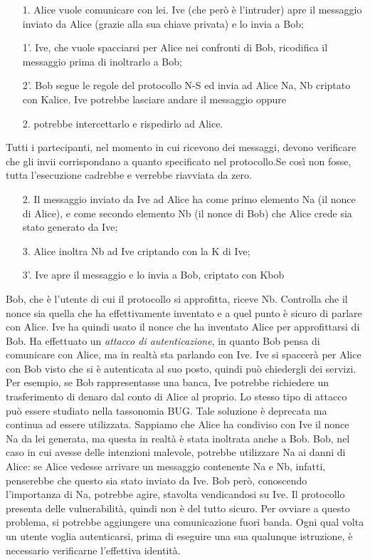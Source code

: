 \begin{enumerate}
    \item[1.]  Alice vuole comunicare con lei. Ive (che però è l’intruder)
        apre il messaggio inviato da Alice
        (grazie alla sua chiave privata) e lo invia a Bob;
    \item[1'.] Ive, che vuole spacciarsi per Alice nei confronti di Bob,
        ricodifica il messaggio prima di inoltrarlo
        a Bob;
    \item[2'.] Bob segue le regole del protocollo N-S ed invia ad Alice
            {Na, Nb} criptato con Kalice. Ive
        potrebbe lasciare andare il messaggio oppure
    \item[2.] potrebbe intercettarlo e rispedirlo ad Alice.
\end{enumerate}
Tutti i partecipanti, nel momento in cui ricevono dei messaggi, devono
verificare che gli invii
corrispondano a quanto specificato nel protocollo.Se così non fosse, tutta
l’esecuzione cadrebbe e
verrebbe riavviata da zero.

\begin{enumerate}
    \item[2.] Il messaggio inviato da Ive ad Alice ha come primo
        elemento Na (il nonce di Alice), e come secondo elemento Nb
        (il nonce di Bob) che Alice crede sia stato
        generato da Ive;
    \item[3.] Alice inoltra Nb ad Ive criptando con la K di Ive;
    \item[3'.] Ive apre il messaggio e lo invia a Bob, criptato con Kbob
\end{enumerate}

Bob, che è l’utente di cui il protocollo si approfitta, riceve Nb.
Controlla che il nonce sia quella che
ha effettivamente inventato e a quel punto è sicuro di parlare con Alice.
Ive ha quindi usato il nonce che ha inventato Alice per approfittarsi di
Bob. Ha effettuato un
\textit{attacco di autenticazione}, in quanto Bob pensa di comunicare con
Alice, ma in realtà sta parlando
con Ive.
Ive si spaccerà per Alice con Bob visto che si è autenticata al suo posto,
quindi può chiedergli dei
servizi. Per esempio, se Bob rappresentasse una banca, Ive potrebbe
richiedere un trasferimento
di denaro dal conto di Alice al proprio.
Lo stesso tipo di attacco può essere studiato nella tassonomia BUG. Tale
soluzione è deprecata
ma continua ad essere utilizzata.
Sappiamo che Alice ha condiviso con Ive il nonce Na da lei generata, ma
questa in realtà è stata
inoltrata anche a Bob. Bob, nel caso in cui avesse delle intenzioni
malevole, potrebbe utilizzare Na
ai danni di Alice: se Alice vedesse arrivare un messaggio contenente Na
e Nb, infatti, penserebbe
che questo sia stato inviato da Ive. Bob però, conoscendo l’importanza di
Na, potrebbe agire,
stavolta vendicandosi su Ive.
Il protocollo presenta delle vulnerabilità, quindi non è del tutto sicuro.
Per ovviare a questo
problema, si potrebbe aggiungere una comunicazione fuori banda. Ogni qual
volta un utente voglia
autenticarsi, prima di eseguire una sua qualunque istruzione, è necessario
verificarne l’effettiva
identità.

